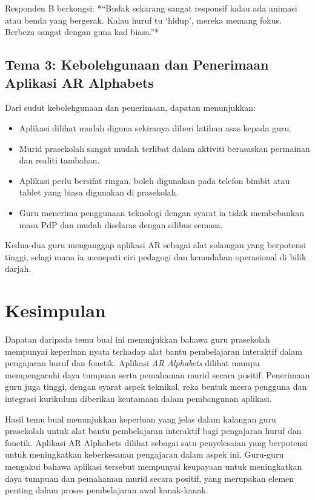 {{Responden B berkongsi: *“Budak sekarang sangat responsif kalau ada animasi atau benda yang bergerak. Kalau huruf tu ‘hidup’, mereka memang fokus. Berbeza sangat dengan guna kad biasa.”*

\vspace{0.3cm}
\subsection*{Tema 3: Kebolehgunaan dan Penerimaan Aplikasi AR Alphabets}
Dari sudut kebolehgunaan dan penerimaan, dapatan menunjukkan:

\begin{itemize}[label=--]
    \item Aplikasi dilihat mudah diguna sekiranya diberi latihan asas kepada guru.
    \item Murid prasekolah sangat mudah terlibat dalam aktiviti berasaskan permainan dan realiti tambahan.
    \item Aplikasi perlu bersifat ringan, boleh digunakan pada telefon bimbit atau tablet yang biasa digunakan di prasekolah.
    \item Guru menerima penggunaan teknologi dengan syarat ia tidak membebankan masa PdP dan mudah diselaras dengan silibus semasa.
\end{itemize}

Kedua-dua guru menganggap aplikasi AR sebagai alat sokongan yang berpotensi tinggi, selagi mana ia menepati ciri pedagogi dan kemudahan operasional di bilik darjah.

\vspace{0.5cm}
\section*{Kesimpulan}
Dapatan daripada temu bual ini menunjukkan bahawa guru prasekolah mempunyai keperluan nyata terhadap alat bantu pembelajaran interaktif dalam pengajaran huruf dan fonetik. Aplikasi \textit{AR Alphabets} dilihat mampu mempengaruhi daya tumpuan serta pemahaman murid secara positif. Penerimaan guru juga tinggi, dengan syarat aspek teknikal, reka bentuk mesra pengguna dan integrasi kurikulum diberikan keutamaan dalam pembangunan aplikasi.

Hasil temu bual menunjukkan keperluan yang jelas dalam kalangan guru prasekolah untuk alat bantu pembelajaran interaktif bagi pengajaran huruf dan fonetik. Aplikasi AR Alphabets dilihat sebagai satu penyelesaian yang berpotensi untuk meningkatkan keberkesanan pengajaran dalam aspek ini. Guru-guru mengakui bahawa aplikasi tersebut mempunyai keupayaan untuk meningkatkan daya tumpuan dan pemahaman murid secara positif, yang merupakan elemen penting dalam proses pembelajaran awal kanak-kanak.

}}
